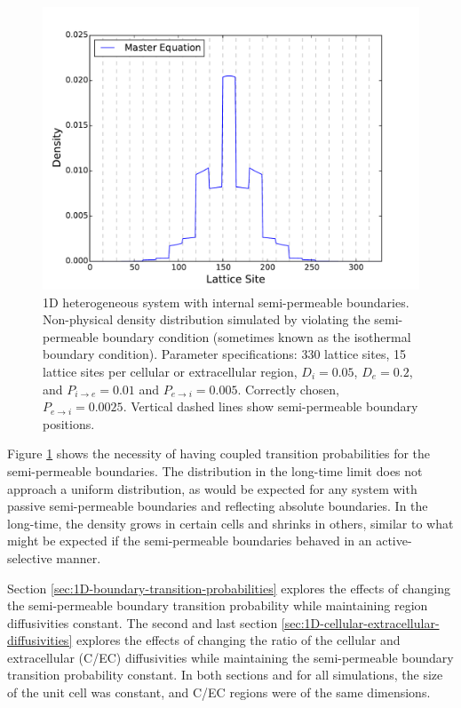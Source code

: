 	\begin{figure}[h]
		\centering
		\includegraphics[width=1.0\linewidth]{../images/1D/11U_heterogeneous_plots_1D_nonphysical}
		\caption{1D heterogeneous system with internal semi-permeable boundaries. Non-physical density distribution simulated by violating the semi-permeable boundary condition (sometimes known as the isothermal boundary condition). Parameter specifications: 330 lattice sites, 15 lattice sites per cellular or extracellular region, $ D_i = 0.05 $, $ D_e = 0.2 $, and $ P_{i\rightarrow e} = 0.01 $ and $ P_{e\rightarrow i} =  0.005 $. Correctly chosen, $ P_{e\rightarrow i} =  0.0025 $. Vertical dashed lines show semi-permeable boundary positions. }
		\label{fig:11U_heterogeneous_plots_1D_nonphysical}
	\end{figure}
	
	\newpage
	Figure \ref{fig:11U_heterogeneous_plots_1D_nonphysical} shows the necessity of having coupled transition probabilities for the semi-permeable boundaries. The distribution in the long-time limit does not approach a uniform distribution, as would be expected for any system with passive semi-permeable boundaries and reflecting absolute boundaries. In the long-time, the density grows in certain cells and shrinks in others, similar to what might be expected if the semi-permeable boundaries behaved in an active-selective manner. 
	
	Section \ref{sec:1D-boundary-transition-probabilities} explores the effects of changing the semi-permeable boundary transition probability while maintaining region diffusivities constant. The second and last section \ref{sec:1D-cellular-extracellular-diffusivities} explores the effects of changing the ratio of the cellular and extracellular (C/EC) diffusivities while maintaining the semi-permeable boundary transition probability constant. In both sections and for all simulations, the size of the unit cell was constant, and C/EC regions were of the same dimensions.
	
